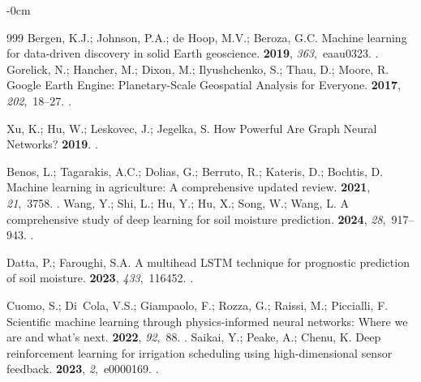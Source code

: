 \documentclass[land,review,accept,pdftex,oneauthor]{Definitions/mdpi}
\begin{document}
\begin{adjustwidth}{-\extralength}{0cm}
\begin{thebibliography}{999}
Bergen, K.J.; Johnson, P.A.; de Hoop, M.V.; Beroza, G.C.
\newblock Machine learning for data-driven discovery in solid Earth geoscience.
 {\bf 2019}, {\em 363},~eaau0323.
.
Gorelick, N.; Hancher, M.; Dixon, M.; Ilyushchenko, S.; Thau, D.; Moore, R.
\newblock Google Earth Engine: Planetary-Scale Geospatial Analysis for
  Everyone.
 {\bf 2017}, {\em 202},~18--27.
.

Xu, K.; Hu, W.; Leskovec, J.; Jegelka, S.
\newblock How Powerful Are Graph Neural Networks?
 {\bf
  2019}.
.

Benos, L.; Tagarakis, A.C.; Dolias, G.; Berruto, R.; Kateris, D.; Bochtis, D.
\newblock Machine learning in agriculture: A comprehensive updated review.
 {\bf 2021}, {\em 21},~3758.
.
Wang, Y.; Shi, L.; Hu, Y.; Hu, X.; Song, W.; Wang, L.
\newblock A comprehensive study of deep learning for soil moisture prediction.
 {\bf 2024}, {\em
  28},~917--943.
.

Datta, P.; Faroughi, S.A.
\newblock A multihead LSTM technique for prognostic prediction of soil
  moisture.
 {\bf 2023}, {\em 433},~116452.
.

Cuomo, S.; Di~Cola, V.S.; Giampaolo, F.; Rozza, G.; Raissi, M.; Piccialli, F.
\newblock Scientific machine learning through physics-informed neural networks: Where we are and what's next.
 {\bf 2022}, {\em 92},~88.
.
Saikai, Y.; Peake, A.; Chenu, K.
\newblock Deep reinforcement learning for irrigation scheduling using
  high-dimensional sensor feedback.
 {\bf 2023}, {\em 2},~e0000169.
.


\end{thebibliography}
\end{adjustwidth}
\end{document}
